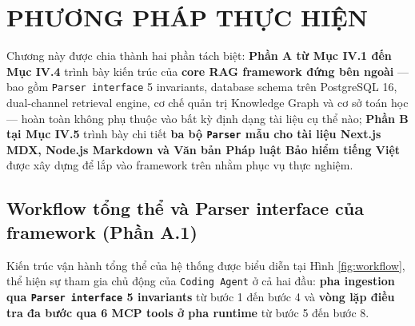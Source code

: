 \section{PHƯƠNG PHÁP THỰC HIỆN}

Chương này được chia thành hai phần tách biệt: \textbf{Phần A từ Mục IV.1 đến Mục IV.4} trình bày kiến trúc của \textbf{core RAG framework đứng bên ngoài} — bao gồm \texttt{Parser interface} 5 invariants, database schema trên PostgreSQL 16, dual-channel retrieval engine, cơ chế quản trị Knowledge Graph và cơ sở toán học — hoàn toàn không phụ thuộc vào bất kỳ định dạng tài liệu cụ thể nào; \textbf{Phần B tại Mục IV.5} trình bày chi tiết \textbf{ba bộ \texttt{Parser} mẫu cho tài liệu Next.js MDX, Node.js Markdown và Văn bản Pháp luật Bảo hiểm tiếng Việt} được xây dựng để lắp vào framework trên nhằm phục vụ thực nghiệm.

\subsection{Workflow tổng thể và Parser interface của framework (Phần A.1)}
Kiến trúc vận hành tổng thể của hệ thống được biểu diễn tại Hình \ref{fig:workflow}, thể hiện sự tham gia chủ động của \texttt{Coding Agent} ở cả hai đầu: \textbf{pha ingestion qua \texttt{Parser interface} 5 invariants} từ bước 1 đến bước 4 và \textbf{vòng lặp điều tra đa bước qua 6 MCP tools ở pha runtime} từ bước 5 đến bước 8.

